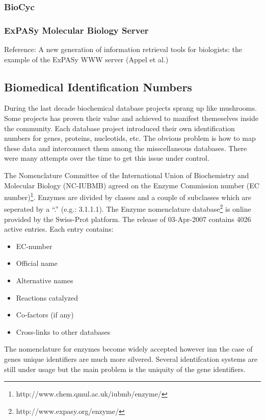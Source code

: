 \subsubsection{BioCyc}
\subsubsection{ExPASy Molecular Biology Server}

Reference: A new generation of information retrieval tools for biologists: the example of the ExPASy WWW server (Appel et al.)

\subsection{Biomedical Identification Numbers}

During the last decade biochemical database projects sprang up like mushrooms. Some projects has proven their value and achieved to manifest themeselves inside the community. Each database project introduced their own identification numbers for genes, proteins, nucleotids, etc. The obvious problem is how to map these data and interconnect them among the misscellaneous databases. 
There were many attempts over the time to get this issue under control.

The Nomenclature Committee of the International Union of Biochemistry and Molecular Biology (NC-IUBMB) agreed on the Enzyme Commission number (EC number)\footnote{http://www.chem.qmul.ac.uk/iubmb/enzyme/}\cite{Bairoch2000}. Enzymes are divided by classes and a couple of subclasses which are seperated by a ``.'' (e.g.: 3.1.1.1). The Enzyme nomenclature database\footnote{http://www.expasy.org/enzyme/} is online provided by the Swiss-Prot platform.
The release of 03-Apr-2007 contains 4026 active entries. 
Each entry contains:
\begin{itemize}
 \item EC-number
 \item Official name
 \item Alternative names
 \item Reactions catalyzed
 \item Co-factors (if any)
 \item Cross-links to other databases
\end{itemize}

The nomenclature for enzymes become widely accepted however inn the case of genes unique identifiers are much more silvered.
Several identifcation systems are still under usage but the main problem is the uniquity of the gene identifiers.

